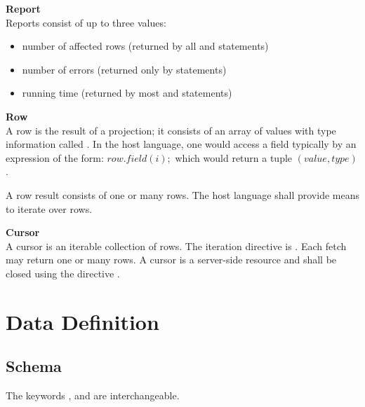 \begin{minipage}{\textwidth}
\textbf{Report}\\
Reports consist of up to three values:
\begin{itemize}
\item number of affected rows
(returned by all  and  statements)
\item number of errors
(returned only by  statements)
\item running time
(returned by most  and  statements)
\end{itemize}
\end{minipage}

\begin{minipage}{\textwidth}
\textbf{Row}\\
A row is the result of a projection;
it consists of an array of values
with type information called .
In the host language, one would access a field
typically by an expression of the form:
$row.field(i);$
which would return a tuple $(value,type)$.

A row result consists of one or many rows.
The host language shall provide means
to iterate over rows.
\end{minipage}

\begin{minipage}{\textwidth}
\textbf{Cursor}\\
A cursor is an iterable collection of rows.
The iteration directive is .
Each fetch may return one or many rows.
A cursor is a server-side resource
and shall be closed using the directive .
\end{minipage}

\section{Data Definition}


\subsection{Schema}
The keywords
,  and 
are interchangeable.

